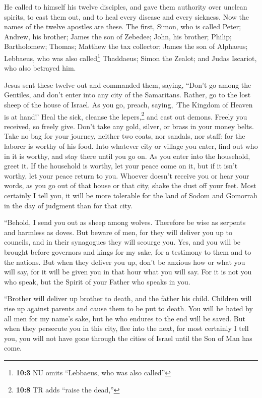  He called to himself his twelve disciples, and gave them
authority over unclean spirits, to cast them out, and to heal every
disease and every sickness.  Now the names of the twelve
apostles are these. The first, Simon, who is called Peter; Andrew, his
brother; James the son of Zebedee; John, his brother; 
Philip; Bartholomew; Thomas; Matthew the tax collector; James the son of
Alphaeus; Lebbaeus, who was also called\footnote{\textbf{10:3} NU omits
  ``Lebbaeus, who was also called''} Thaddaeus;  Simon the
Zealot; and Judas Iscariot, who also betrayed him.

 Jesus sent these twelve out and commanded them, saying,
``Don't go among the Gentiles, and don't enter into any city of the
Samaritans.  Rather, go to the lost sheep of the house of
Israel.  As you go, preach, saying, `The Kingdom of Heaven
is at hand!'  Heal the sick, cleanse the
lepers,\footnote{\textbf{10:8} TR adds ``raise the dead,''} and cast out
demons. Freely you received, so freely give.  Don't take
any gold, silver, or brass in your money belts.  Take no
bag for your journey, neither two coats, nor sandals, nor staff: for the
laborer is worthy of his food.  Into whatever city or
village you enter, find out who in it is worthy, and stay there until
you go on.  As you enter into the household, greet it.
 If the household is worthy, let your peace come on it,
but if it isn't worthy, let your peace return to you. 
Whoever doesn't receive you or hear your words, as you go out of that
house or that city, shake the dust off your feet.  Most
certainly I tell you, it will be more tolerable for the land of Sodom
and Gomorrah in the day of judgment than for that city.

 ``Behold, I send you out as sheep among wolves.
Therefore be wise as serpents and harmless as doves.  But
beware of men, for they will deliver you up to councils, and in their
synagogues they will scourge you.  Yes, and you will be
brought before governors and kings for my sake, for a testimony to them
and to the nations.  But when they deliver you up, don't
be anxious how or what you will say, for it will be given you in that
hour what you will say.  For it is not you who speak, but
the Spirit of your Father who speaks in you.

 ``Brother will deliver up brother to death, and the
father his child. Children will rise up against parents and cause them
to be put to death.  You will be hated by all men for my
name's sake, but he who endures to the end will be saved.
 But when they persecute you in this city, flee into the
next, for most certainly I tell you, you will not have gone through the
cities of Israel until the Son of Man has come.

